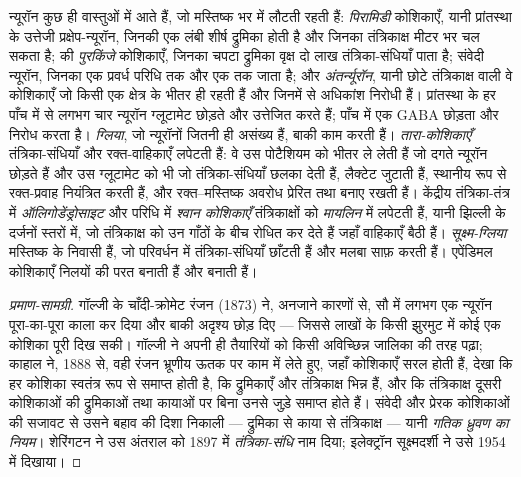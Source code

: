 \begin{definition}[तंत्रिका-तंत्र की कोशिकाएँ]\label{def:b3:nervous-systems:cells}
न्यूरॉन कुछ ही वास्तुओं में आते हैं, जो मस्तिष्क भर में लौटती रहती हैं:
\emph{पिरामिडी} कोशिकाएँ, यानी प्रांतस्था के उत्तेजी प्रक्षेप-न्यूरॉन,
जिनकी एक लंबी शीर्ष द्रुमिका होती है और जिनका तंत्रिकाक्ष मीटर भर चल
सकता है;  की \emph{पुरकिंजे} कोशिकाएँ, जिनका चपटा द्रुमिका
वृक्ष दो लाख तंत्रिका-संधियाँ पाता है; संवेदी न्यूरॉन, जिनका एक प्रवर्ध
परिधि तक और एक  तक जाता है; और \emph{अंतर्न्यूरॉन}, यानी छोटे
तंत्रिकाक्ष वाली वे कोशिकाएँ जो किसी एक क्षेत्र के भीतर ही रहती हैं और
जिनमें से अधिकांश निरोधी हैं। प्रांतस्था के हर पाँच में से लगभग चार
न्यूरॉन ग्लूटामेट छोड़ते और उत्तेजित करते हैं; पाँच में एक GABA छोड़ता
और निरोध करता है। \emph{ग्लिया}, जो न्यूरॉनों जितनी ही असंख्य हैं, बाकी
काम करती हैं। \emph{तारा-कोशिकाएँ} तंत्रिका-संधियाँ और रक्त-वाहिकाएँ
लपेटती हैं: वे उस पोटैशियम को भीतर ले लेती हैं जो दगते न्यूरॉन छोड़ते
हैं और उस ग्लूटामेट को भी जो तंत्रिका-संधियाँ छलका देती हैं, लैक्टेट
जुटाती हैं, स्थानीय रूप से रक्त-प्रवाह नियंत्रित करती हैं, और
रक्त--मस्तिष्क अवरोध प्रेरित तथा बनाए रखती हैं। केंद्रीय तंत्रिका-तंत्र
में \emph{ऑलिगोडेंड्रोसाइट} और परिधि में \emph{श्वान कोशिकाएँ}
तंत्रिकाक्षों को \emph{मायलिन} में लपेटती हैं, यानी झिल्ली के दर्जनों
स्तरों में, जो तंत्रिकाक्ष को उन गाँठों के बीच रोधित कर देते हैं जहाँ
वाहिकाएँ बैठी हैं। \emph{सूक्ष्म-ग्लिया} मस्तिष्क के निवासी 
हैं, जो परिवर्धन में तंत्रिका-संधियाँ छाँटती हैं और मलबा साफ़ करती
हैं। एपेंडिमल कोशिकाएँ निलयों की परत बनाती हैं और 
बनाती हैं।
\end{definition}

\begin{proof}[प्रमाण-सामग्री]
गॉल्जी के चाँदी-क्रोमेट रंजन (1873) ने, अनजाने कारणों से, सौ में लगभग
एक न्यूरॉन पूरा-का-पूरा काला कर दिया और बाकी अदृश्य छोड़ दिए --- जिससे
लाखों के किसी झुरमुट में कोई एक कोशिका पूरी दिख सकी। गॉल्जी ने अपनी ही
तैयारियों को किसी अविच्छिन्न जालिका की तरह पढ़ा; काहाल ने, 1888 से,
वही रंजन भ्रूणीय ऊतक पर काम में लेते हुए, जहाँ कोशिकाएँ सरल होती हैं,
देखा कि हर कोशिका स्वतंत्र रूप से समाप्त होती है, कि द्रुमिकाएँ और
तंत्रिकाक्ष भिन्न हैं, और कि तंत्रिकाक्ष दूसरी कोशिकाओं की द्रुमिकाओं
तथा कायाओं पर बिना उनसे जुड़े समाप्त होते हैं। संवेदी और प्रेरक
कोशिकाओं की सजावट से उसने बहाव की दिशा निकाली --- द्रुमिका से काया से
तंत्रिकाक्ष --- यानी \emph{गतिक ध्रुवण का नियम}। शेरिंगटन ने उस अंतराल
को 1897 में \emph{तंत्रिका-संधि} नाम दिया; इलेक्ट्रॉन सूक्ष्मदर्शी ने
उसे 1954 में दिखाया।
\end{proof}

